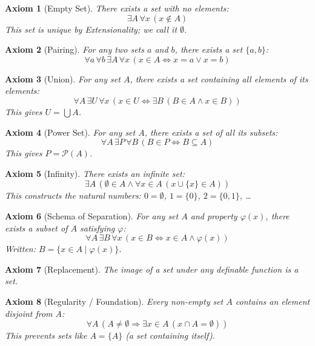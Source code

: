 \documentclass[12pt, a4paper]{article}
\newtheorem{axiom}{Axiom}[section]
\begin{document}
\begin{axiom}[Empty Set]
There exists a set with no elements:
$$\exists A \, \forall x \, (x \notin A)$$
This set is unique by Extensionality; we call it $\emptyset$.
\end{axiom}

\begin{axiom}[Pairing]
For any two sets $a$ and $b$, there exists a set $\{a, b\}$:
$$\forall a \, \forall b \, \exists A \, \forall x \, (x \in A \iff x = a \lor x = b)$$
\end{axiom}

\begin{axiom}[Union]
For any set $A$, there exists a set containing all elements of its elements:
$$\forall A \, \exists U \, \forall x \, (x \in U \iff \exists B \, (B \in A \land x \in B))$$
This gives $U = \bigcup A$.
\end{axiom}

\begin{axiom}[Power Set]
For any set $A$, there exists a set of all its subsets:
$$\forall A \, \exists P \, \forall B \, (B \in P \iff B \subseteq A)$$
This gives $P = \mathcal{P}(A)$.
\end{axiom}

\begin{axiom}[Infinity]
There exists an infinite set:
$$\exists A \, (\emptyset \in A \land \forall x \in A \, (x \cup \{x\} \in A))$$
This constructs the natural numbers: $0 = \emptyset$, $1 = \{0\}$, $2 = \{0,1\}$, \ldots
\end{axiom}

\begin{axiom}[Schema of Separation]
For any set $A$ and property $\varphi(x)$, there exists a subset of $A$ satisfying $\varphi$:
$$\forall A \, \exists B \, \forall x \, (x \in B \iff x \in A \land \varphi(x))$$
Written: $B = \{ x \in A \mid \varphi(x) \}$.
\end{axiom}

\begin{axiom}[Replacement]
The image of a set under any definable function is a set.
\end{axiom}

\begin{axiom}[Regularity / Foundation]
Every non-empty set $A$ contains an element disjoint from $A$:
$$\forall A \, (A \neq \emptyset \Rightarrow \exists x \in A \, (x \cap A = \emptyset))$$
This prevents sets like $A = \{A\}$ (a set containing itself).
\end{axiom}
\end{document}
